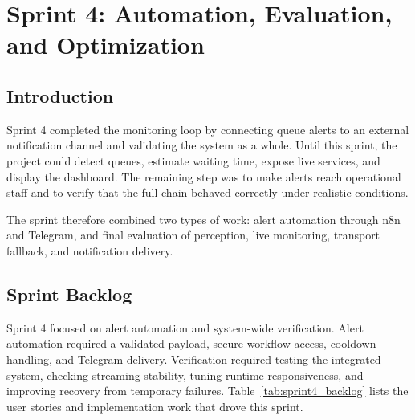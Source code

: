 \chapter{Sprint 4: Automation, Evaluation, and Optimization}
\chaptertoc

\clearpage

\section{Introduction}
Sprint 4 completed the monitoring loop by connecting queue alerts to an external notification channel and validating the system as a whole. Until this sprint, the project could detect queues, estimate waiting time, expose live services, and display the dashboard. The remaining step was to make alerts reach operational staff and to verify that the full chain behaved correctly under realistic conditions.

The sprint therefore combined two types of work: alert automation through n8n and Telegram, and final evaluation of perception, live monitoring, transport fallback, and notification delivery.

\section{Sprint Backlog}
Sprint 4 focused on alert automation and system-wide verification. Alert automation required a validated payload, secure workflow access, cooldown handling, and Telegram delivery. Verification required testing the integrated system, checking streaming stability, tuning runtime responsiveness, and improving recovery from temporary failures. Table~\ref{tab:sprint4_backlog} lists the user stories and implementation work that drove this sprint.

